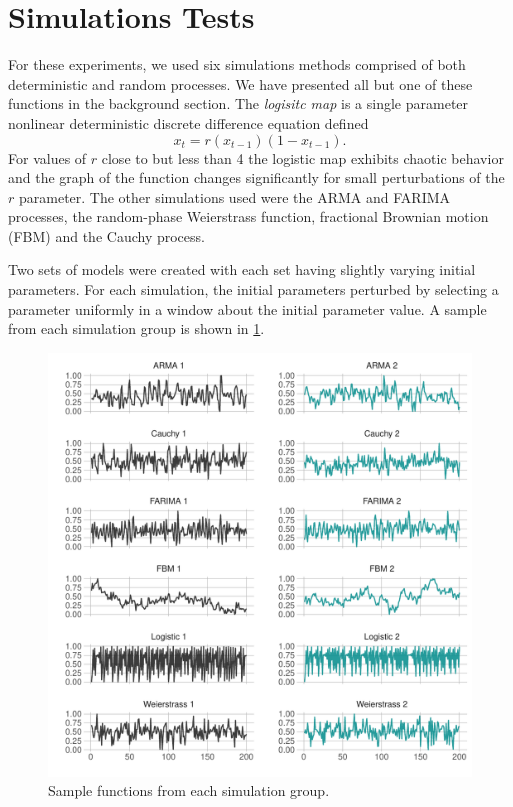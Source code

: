\section{Simulations Tests}

For these experiments, we used six simulations methods comprised of both deterministic and random processes. We have presented all but one of these functions in the background section. The \textit{logisitc map}  is a single parameter nonlinear deterministic discrete difference equation defined
\[
  x_t = r(x_{t-1})(1 - x_{t-1}).
\]
For values of $r$ close to but less than 4 the logistic map exhibits chaotic behavior and the graph of the function
changes significantly for small perturbations of the $r$ parameter. The other simulations used were the ARMA and FARIMA processes, the random-phase Weierstrass function, fractional Brownian motion (FBM) and the Cauchy process. 

Two sets of models were created with each set having slightly varying initial parameters. For each simulation, the initial parameters perturbed by selecting a parameter uniformly in a window about the initial parameter value. A sample from each simulation group is shown in \ref{fig:jitter-ts}. 

\begin{figure}[!htbp]
  \begin{center}
  \includegraphics[width = \textwidth, keepaspectratio]{./figs/sim_jitter_plot_jitter_timeseries.pdf}
  \end{center} 
  \caption{Sample functions from each simulation group.  }
   \label{fig:jitter-ts}
\end{figure}


